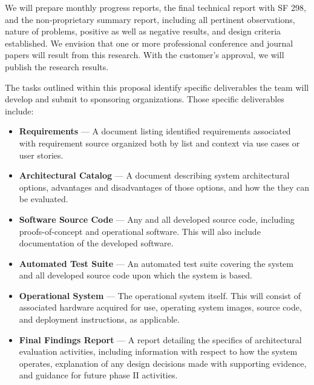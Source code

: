 \documentclass{sbir}
\begin{document}
We will prepare monthly progress reports, the final technical report with SF 298, and the non-proprietary summary report, including all pertinent observations, nature of problems, positive as well as negative results, and design criteria established. We envision that one or more professional conference and journal papers will result from this research. With the customer's approval, we will publish the research results.

The tasks outlined within this proposal identify specific deliverables the team will develop and submit to sponsoring organizations. Those specific deliverables include:

\begin{itemize}
\item {\bf Requirements} --- A document listing identified requirements associated with requirement source organized both by list and context via use cases or user stories.
\item {\bf Architectural Catalog} --- A document describing system architectural options, advantages and disadvantages of those options, and how the they can be evaluated.
\item {\bf Software Source Code} --- Any and all developed source code, including proofs-of-concept and operational software.  This will also include documentation of the developed software.
\item {\bf Automated Test Suite} --- An automated test suite covering the system and all developed source code upon which the system is based.
\item {\bf Operational System} --- The operational system itself.  This will consist of associated hardware acquired for use, operating system images, source code, and deployment instructions, as applicable.
\item {\bf Final Findings Report} --- A report detailing the specifics of architectural evaluation activities, including information with respect to how the system operates, explanation of any design decisions made with supporting evidence, and guidance for future phase II activities.
\end{itemize}

\end{document}
